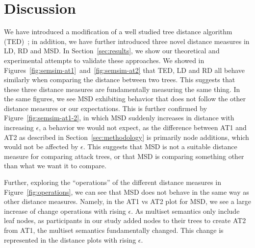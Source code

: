 
\section{Discussion}
\label{sec:discussion}








We have introduced a modification of a well studied tree distance algorithm (TED)~\cite{Zhang_Shasha_1989}; in addition, we have further introduced three novel distance measures in LD, RD and MSD. In Section~\ref{sec:results}, we show our theoretical and experimental attempts to validate these approaches. We showed in Figures~\ref{fig:semsim-at1}~and~\ref{fig:semsim-at2} that TED, LD and RD all behave similarly when comparing the distance between two trees. This suggests that these three distance measures are fundamentally measuring the same thing. In the same figures, we see MSD exhibiting behavior that does not follow the other distance measures or our expectations. This is further confirmed by Figure~\ref{fig:semsim-at1-2}, in which MSD suddenly increases in distance with increasing $\epsilon$, a behavior we would not expect, as the difference between AT1 and AT2 as described in Section~\ref{sec:methodology} is primarily node additions, which would not be affected by $\epsilon$. This suggests that MSD is not a suitable distance measure for comparing attack trees, or that MSD is comparing something other than what we want it to compare.

Further, exploring the ``operations'' of the different distance measures in Figure~\ref{fig:operations}, we can see that MSD does not behave in the same way as other distance measures. Namely, in the AT1 vs AT2 plot for MSD, we see a large increase of change operations with rising $\epsilon$. As multiset semantics only include leaf nodes, as participants in our study added nodes to their trees to create AT2 from AT1, the multiset semantics fundamentally changed. This change is represented in the distance plots with rising $\epsilon$.

